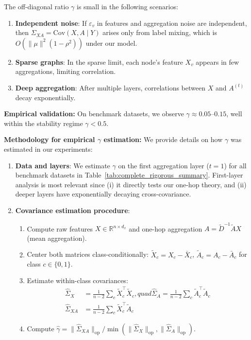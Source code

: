 \begin{remark}
\label{rem:gamma_small}
The off-diagonal ratio $\gamma$ is small in the following scenarios:
\begin{enumerate}
    \item \textbf{Independent noise}: If $\varepsilon_v$ in features and aggregation noise are independent, then $\Sigma_{XA} = \mathrm{Cov}(X, A \mid Y)$ arises only from label mixing, which is $O(\|\mu\|^2(1-\rho^2))$ under our model.
    \item \textbf{Sparse graphs}: In the sparse limit, each node's feature $X_v$ appears in few aggregations, limiting correlation.
    \item \textbf{Deep aggregation}: After multiple layers, correlations between $X$ and $A^{(t)}$ decay exponentially.
\end{enumerate}

\textbf{Empirical validation:} On benchmark datasets, we observe $\gamma \approx 0.05$--$0.15$, well within the stability regime $\gamma < 0.5$.

\textbf{Methodology for empirical $\gamma$ estimation:}
We provide details on how $\gamma$ was estimated in our experiments:
\begin{enumerate}
    \item \textbf{Data and layers}: We estimate $\gamma$ on the first aggregation layer ($t=1$) for all benchmark datasets in Table~\ref{tab:complete_rigorous_summary}. First-layer analysis is most relevant since (i) it directly tests our one-hop theory, and (ii) deeper layers have exponentially decaying cross-covariance.

    \item \textbf{Covariance estimation procedure}:
    \begin{enumerate}
        \item[(a)] Compute raw features $X \in \mathbb{R}^{n \times d_x}$ and one-hop aggregation $A = \tilde{D}^{-1}\tilde{A}X$ (mean aggregation).
        \item[(b)] Center both matrices class-conditionally: $\tilde{X}_c = X_c - \bar{X}_c$, $\tilde{A}_c = A_c - \bar{A}_c$ for class $c \in \{0, 1\}$.
        \item[(c)] Estimate within-class covariances:
        \begin{align}
            \hat{\Sigma}_X &= \frac{1}{n-2}\sum_{c} \tilde{X}_c^\top \tilde{X}_c, quad
            \hat{\Sigma}_A = \frac{1}{n-2}\sum_{c} \tilde{A}_c^\top \tilde{A}_c \\
            \hat{\Sigma}_{XA} &= \frac{1}{n-2}\sum_{c} \tilde{X}_c^\top \tilde{A}_c
        \end{align}
        \item[(d)] Compute $\hat{\gamma} = \|\hat{\Sigma}_{XA}\|_{\mathrm{op}} / \min(\|\hat{\Sigma}_X\|_{\mathrm{op}}, \|\hat{\Sigma}_A\|_{\mathrm{op}})$.
    \end{enumerate}


\end{enumerate}
\end{remark}

